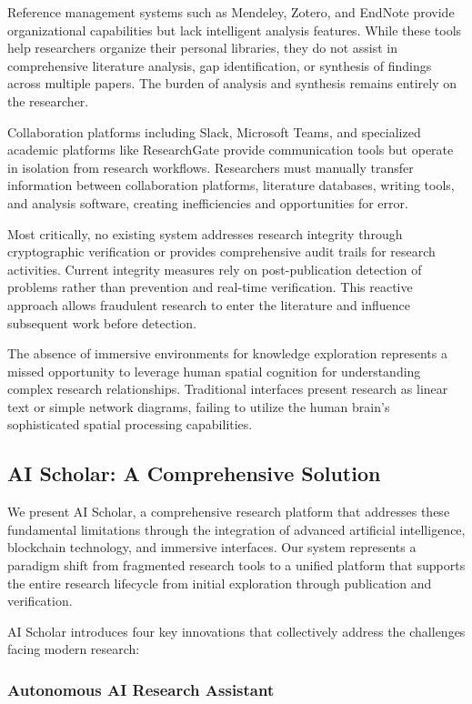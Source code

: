 \documentclass[10pt,twocolumn]{article}
\begin{document}
Reference management systems such as Mendeley, Zotero, and EndNote provide organizational capabilities but lack intelligent analysis features. While these tools help researchers organize their personal libraries, they do not assist in comprehensive literature analysis, gap identification, or synthesis of findings across multiple papers. The burden of analysis and synthesis remains entirely on the researcher.

Collaboration platforms including Slack, Microsoft Teams, and specialized academic platforms like ResearchGate provide communication tools but operate in isolation from research workflows. Researchers must manually transfer information between collaboration platforms, literature databases, writing tools, and analysis software, creating inefficiencies and opportunities for error.

Most critically, no existing system addresses research integrity through cryptographic verification or provides comprehensive audit trails for research activities. Current integrity measures rely on post-publication detection of problems rather than prevention and real-time verification. This reactive approach allows fraudulent research to enter the literature and influence subsequent work before detection.

The absence of immersive environments for knowledge exploration represents a missed opportunity to leverage human spatial cognition for understanding complex research relationships. Traditional interfaces present research as linear text or simple network diagrams, failing to utilize the human brain's sophisticated spatial processing capabilities.

\subsection{AI Scholar: A Comprehensive Solution}

We present AI Scholar, a comprehensive research platform that addresses these fundamental limitations through the integration of advanced artificial intelligence, blockchain technology, and immersive interfaces. Our system represents a paradigm shift from fragmented research tools to a unified platform that supports the entire research lifecycle from initial exploration through publication and verification.

AI Scholar introduces four key innovations that collectively address the challenges facing modern research:

\subsubsection{Autonomous AI Research Assistant}
\end{document}
